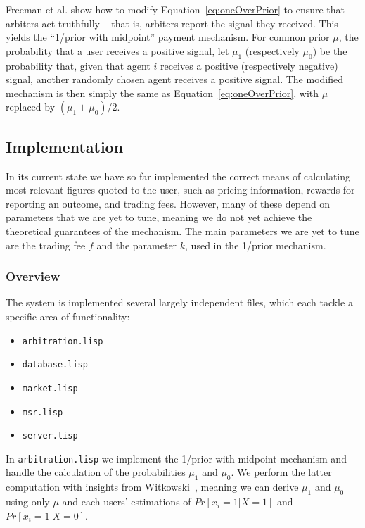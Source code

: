 \documentclass[10pt,a4paper]{article}
\theoremstyle{plain}
\theoremstyle{definition}
\newcommand{\code}[1]{\texttt{#1}}
\begin{document}
Freeman et al. show how to modify Equation~\ref{eq:oneOverPrior} to ensure that
arbiters act truthfully -- that is, arbiters report the signal they received.
This yields the ``1/prior with midpoint'' payment mechanism. For common prior
$\mu$, the probability that a user receives a positive signal, let $\mu_1$
(respectively $\mu_0$) be the probability that, given that agent $i$ receives a
positive (respectively negative) signal, another randomly chosen agent receives
a positive signal. The modified mechanism is then simply the same as
Equation~\ref{eq:oneOverPrior}, with $\mu$ replaced by $(\mu_1 + \mu_0) / 2$.

\subsection{Implementation}

In its current state we have so far implemented the correct means of
calculating most relevant figures quoted to the user, such as pricing
information, rewards for reporting an outcome, and trading fees. However, many
of these depend on parameters that we are yet to tune, meaning we do not yet
achieve the theoretical guarantees of the mechanism. The main parameters we are
yet to tune are the trading fee $f$ and the parameter $k$, used in the 1/prior
mechanism.

\subsubsection{Overview}

The system is implemented several largely independent files, which each tackle
a specific area of functionality:

\begin{itemize}
	\item \code{arbitration.lisp}
	\item \code{database.lisp}
	\item \code{market.lisp}
	\item \code{msr.lisp}
	\item \code{server.lisp}
\end{itemize}

In \code{arbitration.lisp} we implement the 1/prior-with-midpoint mechanism and
handle the calculation of the probabilities $\mu_1$ and $\mu_0$. We perform the
latter computation with insights from Witkowski~\cite{Witkowski2014}, meaning
we can derive $\mu_1$ and $\mu_0$ using only $\mu$ and each users' estimations
of $Pr[x_i=1|X=1]$ and $Pr[x_i=1|X=0]$. %
\end{document}
